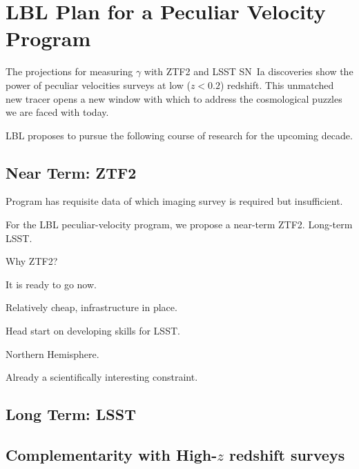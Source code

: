 \documentclass[11pt, oneside]{article}   	%
\begin{document}

\section{LBL Plan for a Peculiar Velocity Program}
The projections for measuring $\gamma$ with ZTF2 and LSST SN~Ia discoveries
show the power of peculiar velocities surveys at low ($z<0.2$) redshift.
This unmatched new tracer opens a new window with which to address
the cosmological puzzles we are faced with today.

LBL proposes to pursue the following course of research for the upcoming decade.

\subsection{Near Term: ZTF2}

Program has requisite data of which imaging survey is required but insufficient.

For the LBL peculiar-velocity program, we propose a near-term ZTF2.  Long-term LSST.

Why ZTF2?


It is ready to go now.

Relatively cheap, infrastructure in place.

Head start on developing skills for LSST.

Northern Hemisphere.

Already a scientifically interesting constraint.

\subsection{Long Term: LSST}

\subsection{Complementarity with High-$z$ redshift surveys}
\end{document}
